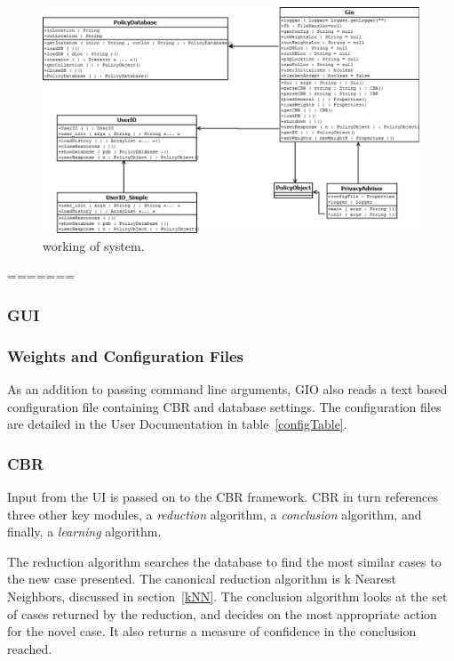 \begin{figure}[htbp]
\begin{center}
\includegraphics[width = \textwidth]{DesignReport/uml/gio.png}
\caption{working of system.}
\label{working of system}
\end{center}
\end{figure}



=======
\subsubsection{GUI} 


\subsubsection{Weights and Configuration Files}
As an addition to passing command line arguments, GIO also reads a text based configuration file containing CBR and database settings. The configuration files are detailed in the User Documentation in table~\ref{configTable}. 

\subsubsection{CBR} %
Input from the UI is passed on to the CBR framework. CBR in turn references three other key modules, a \emph{reduction} algorithm, a \emph{conclusion} algorithm, and finally, a \emph{learning} algorithm.

The reduction algorithm searches the database to find the most similar cases to the new case presented. The canonical reduction algorithm is k Nearest Neighbors, discussed in section~\ref{kNN}. The conclusion algorithm looks at the set of cases returned by the reduction, and decides on the most appropriate action for the novel case. It also returns a measure of confidence in the conclusion reached.

